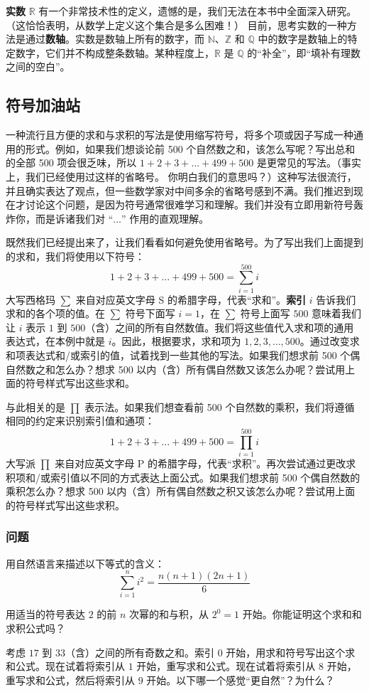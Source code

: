\textbf{实数} $\mathbb{R}$ 有一个非常技术性的定义，遗憾的是，我们无法在本书中全面深入研究。（这恰恰表明，从数学上定义这个集合是多么困难！） 目前，思考实数的一种方法是通过\textbf{数轴}。实数是数轴上所有的数字，而 $\mathbb{N}$、$\mathbb{Z}$ 和 $\mathbb{Q}$ 中的数字是数轴上的特定数字，它们并不构成整条数轴。某种程度上，$\mathbb{R}$ 是 $\mathbb{Q}$ 的“补全”，即“填补有理数之间的空白”。

\subsection{符号加油站}\label{sec:section1.3.5}

一种流行且方便的求和与求积的写法是使用缩写符号，将多个项或因子写成一种通用的形式。例如，如果我们想谈论前 500 个自然数之和，该怎么写呢？写出总和的全部 500 项会很乏味，所以 $1+2+3+\dots+499+500$ 是更常见的写法。（事实上，我们已经使用过这样的省略号。 你明白我们的意思吗？）这种写法很流行，并且确实表达了观点，但一些数学家对中间多余的省略号感到不满。我们推迟到现在才讨论这个问题，是因为符号通常很难学习和理解。我们并没有立即用新符号轰炸你，而是诉诸我们对 “$\dots$” 作用的直观理解。

既然我们已经提出来了，让我们看看如何避免使用省略号。为了写出我们上面提到的求和，我们将使用以下符号：
\[1+2+3+\dots+499+500 = \sum_{i=1}^{500}i\]
大写西格玛 $\sum$ 来自对应英文字母 S 的希腊字母，代表“求和”。\textbf{索引} $i$ 告诉我们求和的各个项的值。在 $\sum$ 符号下面写 $i = 1$，在 $\sum$ 符号上面写 $500$ 意味着我们让 $i$ 表示 $1$ 到 $500$（含）之间的所有自然数值。我们将这些值代入求和项的通用表达式，在本例中就是 $i$。因此，根据要求，求和项为 $1,2,3,\dots,500$。通过改变求和项表达式和/或索引的值，试着找到一些其他的写法。如果我们想求前 500 个偶自然数之和怎么办？想求 500 以内（含）所有偶自然数又该怎么办呢？尝试用上面的符号样式写出这些求和。

与此相关的是 $\prod$ 表示法。如果我们想查看前 500 个自然数的乘积，我们将遵循相同的约定来识别索引值和通项：
\[1+2+3+\dots+499+500 = \prod_{i=1}^{500}i\]
大写派 $\prod$ 来自对应英文字母 P 的希腊字母，代表“求积”。再次尝试通过更改求积项和/或索引值以不同的方式表达上面公式。如果我们想求前 500 个偶自然数的乘积怎么办？想求 500 以内（含）所有偶自然数之积又该怎么办呢？尝试用上面的符号样式写出这些求积。

\subsubsection*{问题}

\begin{problem}
    用自然语言来描述以下等式的含义：
    \[\sum_{i=1}^{n}i^2 = \frac{n(n+1)(2n+1)}{6}\]
\end{problem}
\begin{problem}
    用适当的符号表达 $2$ 的前 $n$ 次幂的和与积，从 $2^0=1$ 开始。你能证明这个求和和求积公式吗？
\end{problem}
\begin{problem}
    考虑 $17$ 到 $33$（含）之间的所有奇数之和。索引 $0$ 开始，用求和符号写出这个求和公式。现在试着将索引从 $1$ 开始，重写求和公式。现在试着将索引从 $8$ 开始，重写求和公式，然后将索引从 $9$ 开始。以下哪一个感觉“更自然”？为什么？
\end{problem}
